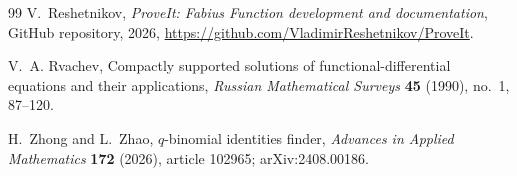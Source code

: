 \documentclass[11pt,oneside,openany]{book}
\theoremstyle{definition}
\theoremstyle{remark}
\begin{document}
\begin{thebibliography}{99}
V.~Reshetnikov,
\emph{ProveIt: Fabius Function development and documentation},
GitHub repository, 2026,
\url{https://github.com/VladimirReshetnikov/ProveIt}.

V.~A. Rvachev,
Compactly supported solutions of functional-differential equations and their applications,
\emph{Russian Mathematical Surveys} \textbf{45} (1990), no.~1, 87--120.

H.~Zhong and L.~Zhao,
$q$-binomial identities finder,
\emph{Advances in Applied Mathematics} \textbf{172} (2026), article 102965;
arXiv:2408.00186.

\end{thebibliography}

\printindex
\end{document}
